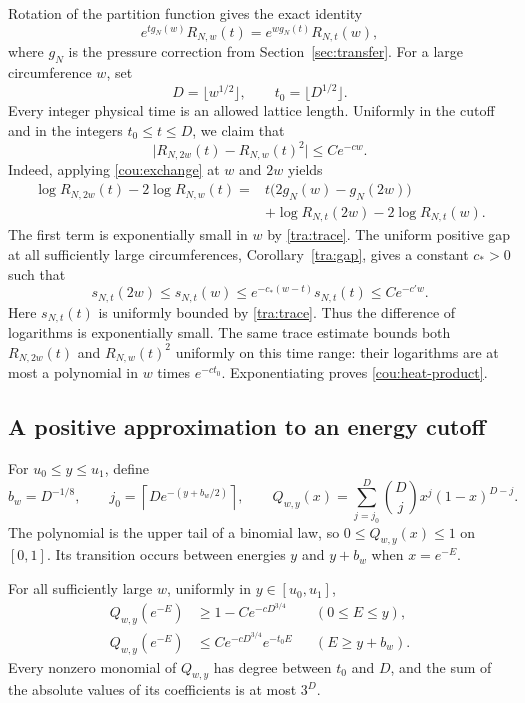 Rotation of the partition function gives the exact identity
\begin{equation}\label{cou:exchange}
 e^{t g_N(w)}R_{N,w}(t)
   =e^{w g_N(t)}R_{N,t}(w),
\end{equation}
where $g_N$ is the pressure correction from Section~\ref{sec:transfer}.
For a large circumference $w$, set
\[
 D=\lfloor w^{1/2}\rfloor,\qquad t_0=\lfloor D^{1/2}\rfloor.
\]
Every integer physical time is an allowed lattice length. Uniformly in the
cutoff and in the integers $t_0\le t\le D$, we claim that
\begin{equation}\label{cou:heat-product}
 \bigl|R_{N,2w}(t)-R_{N,w}(t)^2\bigr|\le Ce^{-cw}.
\end{equation}
Indeed, applying \eqref{cou:exchange} at $w$ and $2w$ yields
\begin{align*}
 \log R_{N,2w}(t)-2\log R_{N,w}(t)
  ={}&t\bigl(2g_N(w)-g_N(2w)\bigr)\\
    &+\log R_{N,t}(2w)-2\log R_{N,t}(w).
\end{align*}
The first term is exponentially small in $w$ by \eqref{tra:trace}.
The uniform positive gap at all sufficiently large circumferences,
Corollary~\ref{tra:gap}, gives a constant $c_*>0$ such that
\[
 s_{N,t}(2w)\le s_{N,t}(w)
 \le e^{-c_*(w-t)}s_{N,t}(t)\le Ce^{-c'w}.
\]
Here $s_{N,t}(t)$ is uniformly bounded by \eqref{tra:trace}.
Thus the difference of logarithms is exponentially small.
The same trace estimate bounds both $R_{N,2w}(t)$ and $R_{N,w}(t)^2$
uniformly on this time range: their logarithms are at most a polynomial
in $w$ times $e^{-ct_0}$. Exponentiating proves
\eqref{cou:heat-product}.

\subsection{A positive approximation to an energy cutoff}

For $u_0\le y\le u_1$, define
\[
 b_w=D^{-1/8},\qquad
 j_0=\left\lceil D e^{-(y+b_w/2)}\right\rceil,
 \qquad
 Q_{w,y}(x)=\sum_{j=j_0}^{D}\binom Dj x^j(1-x)^{D-j}.
\]
The polynomial is the upper tail of a binomial law, so
$0\le Q_{w,y}(x)\le1$ on $[0,1]$. Its transition occurs between energies
$y$ and $y+b_w$ when $x=e^{-E}$.

\begin{lemma}\label{cou:polynomial}
For all sufficiently large $w$, uniformly in $y\in[u_0,u_1]$,
\begin{align}
 Q_{w,y}(e^{-E})&\ge1-Ce^{-cD^{3/4}}
       &&(0\le E\le y),\label{cou:poly-low}\\
 Q_{w,y}(e^{-E})&\le Ce^{-cD^{3/4}}e^{-t_0E}
       &&(E\ge y+b_w).\label{cou:poly-high}
\end{align}
Every nonzero monomial of $Q_{w,y}$ has degree between $t_0$ and $D$,
and the sum of the absolute values of its coefficients is at most $3^D$.
\end{lemma}

